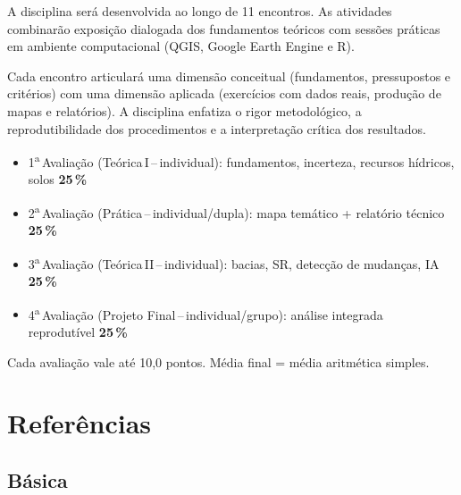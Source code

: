 \documentclass[11pt,a4paper]{article}
\begin{document}
A disciplina será desenvolvida ao longo de 11 encontros. As atividades combinarão exposição dialogada dos fundamentos teóricos com sessões práticas em ambiente computacional (QGIS, Google Earth Engine e R).

Cada encontro articulará uma dimensão conceitual (fundamentos, pressupostos e critérios) com uma dimensão aplicada (exercícios com dados reais, produção de mapas e relatórios). A disciplina enfatiza o rigor metodológico, a reprodutibilidade dos procedimentos e a interpretação crítica dos resultados.


\begin{tcolorbox}[uefsbox, colframe=uefsaccent, colback=white, title={\bfseries\color{white}\scshape Avaliação}, fonttitle=\normalsize, coltitle=white, colbacktitle=uefsaccent, attach boxed title to top left={yshift=-2mm,xshift=2mm}, boxed title style={arc=2pt,boxrule=0pt}]
\begin{itemize}[leftmargin=1.2em]
\item 1\textsuperscript{a}\,Avaliação (Teórica\,I\,--\,individual): fundamentos, incerteza, recursos hídricos, solos\,\dotfill\,\textbf{25\,\%}
\item 2\textsuperscript{a}\,Avaliação (Prática\,--\,individual/dupla): mapa temático + relatório técnico\,\dotfill\,\textbf{25\,\%}
\item 3\textsuperscript{a}\,Avaliação (Teórica\,II\,--\,individual): bacias, SR, detecção de mudanças, IA\,\dotfill\,\textbf{25\,\%}
\item 4\textsuperscript{a}\,Avaliação (Projeto Final\,--\,individual/grupo): análise integrada reprodutível\,\dotfill\,\textbf{25\,\%}
\end{itemize}
\vspace{4pt}
{\footnotesize Cada avaliação vale até 10,0 pontos. Média final = média aritmética simples.}
\end{tcolorbox}



\section*{Referências}

\subsection*{Básica}
\end{document}
